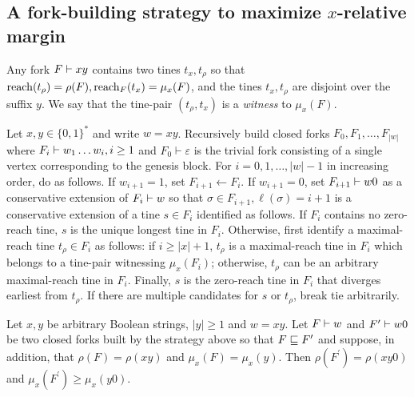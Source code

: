 \subsection{A fork-building strategy to maximize \texorpdfstring{$x$-}{}relative margin}\label{sec:strategy-x}
Any fork $F \vdash xy$ contains two tines $t_x, t_\rho$ 
so that $\operatorname{reach}(t_\rho) = \rho(F), \operatorname{reach}_F(t_x) = \mu_x(F)$, 
and the tines $t_x, t_\rho$ are disjoint over the suffix $y$. 
We say that the tine-pair $(t_\rho, t_x)$ 
is a \emph{witness} to $\mu_x(F)$.


Let $x,y \in \{0,1\}^*$ and write $w = xy$. 
Recursively build closed forks $F_0, F_1, \ldots, F_{|w|}$ 
where $F_i \vdash w_1 \ldots w_i, i \geq 1$ and 
$F_0 \vdash \varepsilon$ is the trivial fork 
consisting of a single vertex 
corresponding to the genesis block. 
For $i = 0, 1, \ldots, |w| - 1$ in increasing order, do as follows.  
If $w_{i + 1} = 1$, set $F_{i+1} \leftarrow F_{i}$. 
If $w_{i+1}=0$, 
set $F_{i + 1} \vdash w0$ 
as a conservative extension of $F_i \vdash w$ so that 
$\sigma \in F_{i+1}, \ell(\sigma) = i + 1$ 
is a conservative extension of a tine $s \in F_i$ 
identified as follows. 
If $F_i$ contains no zero-reach tine, 
$s$ is the unique longest tine in $F_i$. 
Otherwise, 
first identify a maximal-reach tine $t_\rho \in F_i$ as follows:
if $i \geq |x| + 1$, $t_\rho$ is a maximal-reach tine in $F_i$ 
which belongs to a tine-pair witnessing $\mu_x(F_i)$; 
otherwise, $t_\rho$ can be an arbitrary maximal-reach tine in $F_i$. 
Finally, $s$ is the zero-reach tine in $F_i$ 
that diverges earliest from $t_\rho$. 
If there are multiple candidates for $s$ or $t_\rho$, break tie arbitrarily.






\begin{proposition}\label{prop:muxy0-lowerbound-adv}
  Let $x, y$ be arbitrary Boolean strings, $|y| \geq 1$ and $w = xy$. 
  Let $F \vdash w$ and $F^\prime \vdash w0$ be two closed forks 
  built by the strategy 
  above 
  so that $F \sqsubseteq F^\prime$ and suppose, in addition,
  that $\rho(F) = \rho(xy)$ and $\mu_x(F) = \mu_x(y)$. 
  Then $\rho(F^\prime) = \rho(xy0)$ and 
  $\mu_x(F^\prime) \geq \mu_x(y0)$.
\end{proposition}



